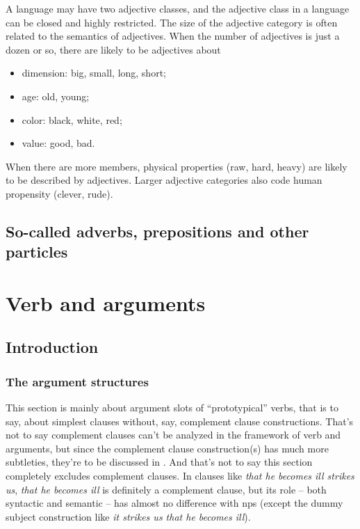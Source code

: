 \documentclass[UTF8, a4paper, oneside, scheme=plain]{ctexart}
\newcommand*{\corpus}[1]{\emph{#1}}
\begin{document}
A language may have two adjective classes, 
and the adjective class in a language can be closed and highly restricted.
The size of the adjective category is often related to the semantics of adjectives. 
When the number of adjectives is just a dozen or so, 
there are likely to be adjectives about
\begin{itemize}
    \item dimension: big, small, long, short;
    \item age: old, young;
    \item color: black, white, red;
    \item value: good, bad.
\end{itemize}
When there are more members, 
physical properties (raw, hard, heavy) are likely to be described by adjectives.
Larger adjective categories also code human propensity (clever, rude).

\subsection{So-called adverbs, prepositions and other particles}

\section{Verb and arguments}

\subsection{Introduction}

\subsubsection{The argument structures}

This section is mainly about argument slots of ``prototypical'' verbs,
that is to say, about simplest clauses without,
say, complement clause constructions.
That's not to say complement clauses 
can't be analyzed in the framework of verb and arguments,
but since the complement clause construction(s) has much more subtleties,
they're to be discussed in .
And that's not to say this section completely excludes 
complement clauses.
In clauses like \corpus{that he becomes ill strikes us},
\corpus{that he becomes ill} is definitely a complement clause,
but its role -- both syntactic and semantic -- has almost no difference with \ac{np}s
(except the dummy subject construction like \corpus{it strikes us that he becomes ill}).
\end{document}
